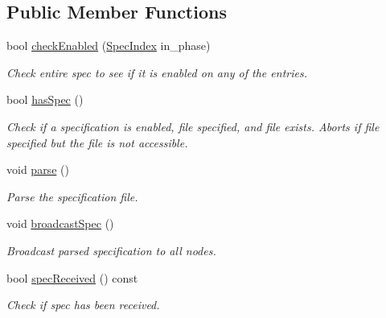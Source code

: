 \subsection*{Public Member Functions}
\begin{DoxyCompactItemize}
\item 
bool \hyperlink{structvt_1_1utils_1_1file__spec_1_1_file_spec_ae7850a9915fb65decca92eb68f2293cb}{check\+Enabled} (\hyperlink{structvt_1_1utils_1_1file__spec_1_1_file_spec_a3817fca09dbe932e0f6ba5729f1965ba}{Spec\+Index} in\+\_\+phase)
\begin{DoxyCompactList}\small\item\em Check entire spec to see if it is enabled on any of the entries. \end{DoxyCompactList}\item 
bool \hyperlink{structvt_1_1utils_1_1file__spec_1_1_file_spec_a74d53e3d243f0f26ec0be262bb07948c}{has\+Spec} ()
\begin{DoxyCompactList}\small\item\em Check if a specification is enabled, file specified, and file exists. Aborts if file specified but the file is not accessible. \end{DoxyCompactList}\item 
void \hyperlink{structvt_1_1utils_1_1file__spec_1_1_file_spec_a8d79f9c2f54891fbe1f70c70d88fb983}{parse} ()
\begin{DoxyCompactList}\small\item\em Parse the specification file. \end{DoxyCompactList}\item 
void \hyperlink{structvt_1_1utils_1_1file__spec_1_1_file_spec_a87745527c8b2dc16cbeb3dd59219db1e}{broadcast\+Spec} ()
\begin{DoxyCompactList}\small\item\em Broadcast parsed specification to all nodes. \end{DoxyCompactList}\item 
bool \hyperlink{structvt_1_1utils_1_1file__spec_1_1_file_spec_a0c22690c282b4dc4813de45b530a3adf}{spec\+Received} () const
\begin{DoxyCompactList}\small\item\em Check if spec has been received. \end{DoxyCompactList}\end{DoxyCompactItemize}
